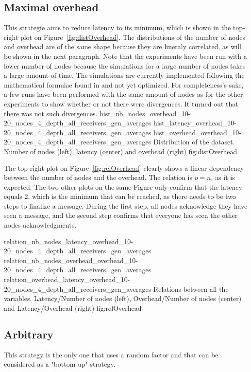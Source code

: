 \subsection{Maximal overhead}
This strategie aims to reduce latency to its minimum, which is shown in the
top-right plot on Figure~\ref{fig:distOverhead}. The distributions of the number
of nodes and overhead are of the same shape because they are lineraly
correlated, as will be shown in the next paragraph. 
Note that the experiments have been run with a lower number of nodes because the
simulations for a large number of nodes takes a large amount of time. The
simulations are currently implemented following the mathematical formulae found
in  and not yet optimized. For completeness's sake, a few runs
have been performed with the same amount of nodes as for the other experiments
to show whether or not there were divergences. It turned out that there was not
such divergences. 
\triplefigure
    {hist_nb_nodes_overhead_10-20_nodes_4_depth_all_receivers_gen_averages}
    {hist_latency_overhead_10-20_nodes_4_depth_all_receivers_gen_averages}
    {hist_overhead_overhead_10-20_nodes_4_depth_all_receivers_gen_averages}
    {Distribution of the dataset. Number of nodes (left), latency (center)
    and overhead (right)}
    {fig:distOverhead}

The top-right plot on Figure~\ref{fig:relOverhead} clearly shows a linear
dependency between the number of nodes and the overhead. The relation is \(o =
n\), as it is expected.
The two other plots on the same Figure only confirm that the latency equals 2,
which is the minimum that can be reached, as there needs to be two steps to
finalize a message. During the first step, all nodes acknowledge they have seen
a message, and the second step confirms that everyone has seen the other nodes
acknowledgments.

\triplefigure
    {relation_nb_nodes_latency_overhead_10-20_nodes_4_depth_all_receivers_gen_averages}
    {relation_nb_nodes_overhead_overhead_10-20_nodes_4_depth_all_receivers_gen_averages}
    {relation_overhead_latency_overhead_10-20_nodes_4_depth_all_receivers_gen_averages}
    {Relations between all the variables. Latency/Number of nodes (left),
    Overhead/Number of nodes (center) and Latency/Overhead (right)}
    {fig:relOverhead}

\subsection{Arbitrary}
This strategy is the only one that uses a random factor and that can be
considered as a "bottom-up" strategy.


